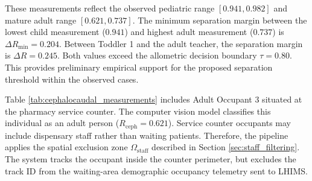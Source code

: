 \begin{table}[htbp]
\centering
\caption{Empirical 17-Keypoint Skeletal Anthropometric Measurements Across Real CCTV Surveillance Feeds ($n=6$ Sample)}
\label{tab:cephalocaudal_measurements}
\end{table}

These measurements reflect the observed pediatric range $[0.941, 0.982]$ and mature adult range $[0.621, 0.737]$. The minimum separation margin between the lowest child measurement ($0.941$) and highest adult measurement ($0.737$) is $\Delta R_{\min} = 0.204$. Between Toddler 1 and the adult teacher, the separation margin is $\Delta R = 0.245$. Both values exceed the allometric decision boundary $\tau = 0.80$. This provides preliminary empirical support for the proposed separation threshold within the observed cases.

Table \ref{tab:cephalocaudal_measurements} includes Adult Occupant 3 situated at the pharmacy service counter. The computer vision model classifies this individual as an adult person ($R_{\text{ceph}} = 0.621$). Service counter occupants may include dispensary staff rather than waiting patients. Therefore, the pipeline applies the spatial exclusion zone $\Omega_{\text{staff}}$ described in Section \ref{sec:staff_filtering}. The system tracks the occupant inside the counter perimeter, but excludes the track ID from the waiting-area demographic occupancy telemetry sent to LHIMS.


